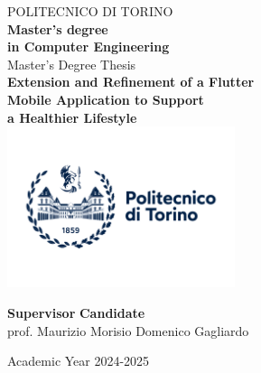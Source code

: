 \begin{titlepage}
    
    \begin{center}
    
    {\huge POLITECNICO DI TORINO}\\[1.5cm]
    \textbf{Master’s degree\\in Computer Engineering}\\[3cm]
    
    {\Large Master's Degree Thesis}\\[0.5cm]
    \textbf{\LARGE Extension and Refinement of a Flutter\\[-0.2cm] Mobile Application to Support\\[0.2cm] a Healthier Lifestyle}\\[2cm]
    \includegraphics[width=0.5\textwidth]{./images/logoPoliTo_with_name_2021.jpg}
    \vspace{2cm}
    
    
    \begin{minipage}{0.85\textwidth}
    \begin{flushleft}\large
    \textbf{Supervisor} \hfill \textbf{Candidate}\\
    prof. Maurizio Morisio \hfill Domenico Gagliardo\\
    \end{flushleft}
    \end{minipage}
    
    \vfill
    
    Academic Year 2024-2025
    \end{center}
    
    \restoregeometry %
    
\end{titlepage}

\begin{titlepage}
    
\tableofcontents

\end{titlepage}